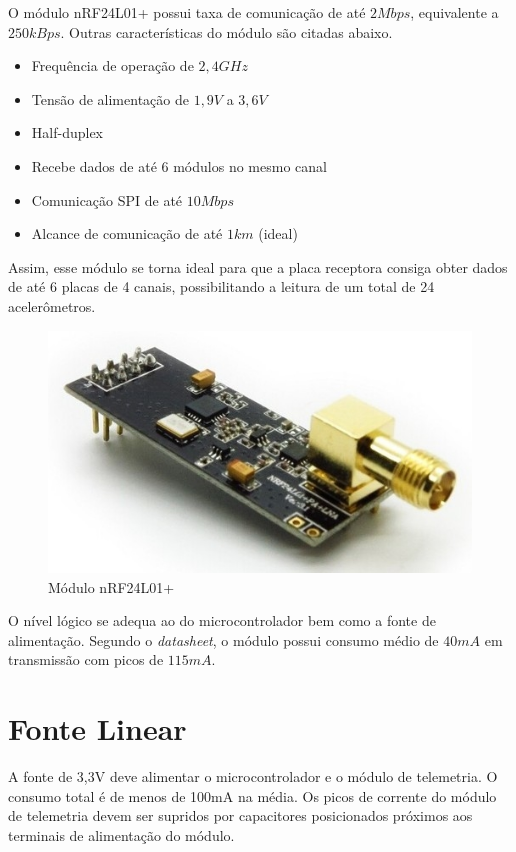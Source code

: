 \documentclass[
	12pt,				%
	openright,			%
	twoside,			%
	a4paper,			%
	english,			%
	french,				%
	spanish,			%
	brazil,				%
	]{abntex2}
\begin{document}
		O módulo nRF24L01+\cite{nrf} possui taxa de comunicação de até $2Mbps$,
		equivalente a $250kBps$. Outras características do módulo são
		citadas abaixo.

		\begin{itemize}
			\item Frequência de operação de $2,4GHz$
			\item Tensão de alimentação de $1,9V$ a $3,6V$
			\item Half-duplex
			\item Recebe dados de até 6 módulos no mesmo canal
			\item Comunicação SPI de até $10Mbps$
			\item Alcance de comunicação de até $1km$ (ideal)
		\end{itemize}

		Assim, esse módulo se torna ideal para que a placa receptora consiga
		obter dados de até 6 placas de 4 canais, possibilitando a leitura de
		um total de 24 acelerômetros.

		\begin{figure}[!ht]
			\centering
			\includegraphics[scale = 0.6]{../Fotos/nrf.jpg}
			\caption[Módulo nRF24L01+]{Módulo nRF24L01+ \footnotemark}
		\end{figure}


		O nível lógico se adequa ao do microcontrolador bem como a fonte
		de alimentação. Segundo o \textit{datasheet}, o módulo possui
		consumo médio de $40mA$ em transmissão com picos de $115mA$.

	\section{Fonte Linear}
		A fonte de 3,3V deve alimentar o microcontrolador e o módulo de
		telemetria. O consumo total é de menos de 100mA na média. Os
		picos de corrente do módulo de telemetria devem ser supridos por
		capacitores posicionados próximos aos terminais de alimentação
		do módulo.
\end{document}
